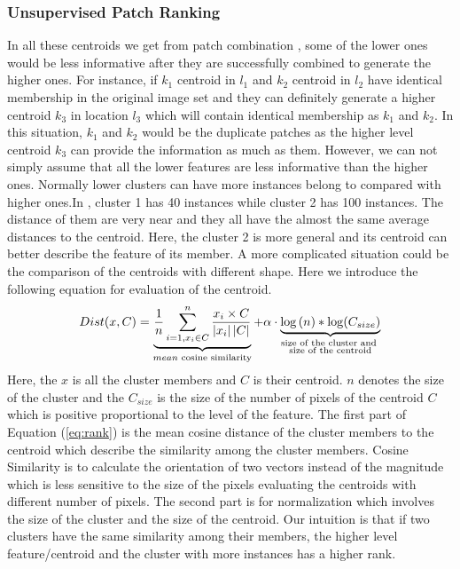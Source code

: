 \subsubsection{Unsupervised Patch Ranking}

In all these centroids we get from patch combination , some of the lower ones would be less informative after they are successfully combined to generate the higher ones. For instance, if $k_1$ centroid in $l_1$ and  $k_2$ centroid in $l_2$ have identical membership in the original image set and they can definitely generate a higher centroid $k_3$ in location $l_3$ which will contain identical membership as $k_1$ and $k_2$. In this situation,  $k_1$ and $k_2$ would be the duplicate patches as the higher level centroid $k_3$ can provide the information as much as them. However, we can not simply assume that all the lower features are less informative than the higher ones. Normally lower clusters can have more instances belong to compared with higher ones.In , cluster 1 has 40 instances while cluster 2 has 100 instances. The distance of them are very near and they all have the almost the same average distances to the centroid. Here, the cluster 2 is more general and its centroid can better describe the feature of its member. A more complicated situation could be the comparison of the centroids with different shape. Here we introduce the following equation for evaluation of the centroid.
\begin{equation}\label{eq:rank}
  Dist(x,C) = \underbrace {\frac{1}{n}\sum\limits_{i = 1,{x_i} \in C}^n {\frac{{{x_i} \times C}}{{\left| {{x_i}} \right|\left| C \right|}}} }_{mean{\text{ cosine similarity}}} + \alpha  \cdot  \underbrace {\log \left( n \right)*\log ({C_{size}})}_{\begin{subarray}{c}
  {\text{size of the cluster and }} \\
  {\text{size of the centroid}}
\end{subarray} }
\end{equation}
Here, the $x$ is all the cluster members and $C$ is their centroid. $n$ denotes the size of the cluster and the $C_{size}$ is the size of the number of pixels of the centroid $C$ which is positive proportional to the level of the feature. The first part of Equation (\ref{eq:rank}) is the mean cosine distance of the cluster members to the centroid which describe the similarity among the cluster members. Cosine Similarity is to calculate the orientation of two vectors instead of the magnitude which is less sensitive to the size of the pixels evaluating the centroids with different number of pixels.
The second part is for normalization which involves the size of the cluster and the size of the centroid. Our intuition is that if two clusters have the same similarity among their members, the higher level feature/centroid and the cluster with more instances has a higher rank.

